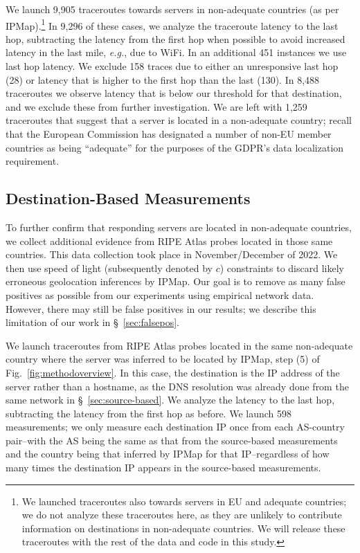 We launch 9,905 traceroutes towards servers in non-adequate countries (as per IPMap).\footnote{We launched 
traceroutes also towards servers in EU and adequate countries; we do not analyze these traceroutes here,
as they are unlikely to contribute information on destinations in non-adequate countries. We will
release these traceroutes with the rest of the data and code in this study.} 
In 9,296 of these cases, we analyze the traceroute latency to the last hop, 
subtracting the latency from the first hop
when possible to avoid increased latency in the last mile, \textit{e.g.}, due to WiFi.
In an additional 451 instances we use last hop latency. 
We exclude 158 traces due to either an unresponsive last hop 
(28) or latency that is higher to the first hop than the last (130).
In 8,488 traceroutes we observe latency that is below our threshold for that destination,
and we exclude these from further investigation. We are left with 1,259 traceroutes
that suggest that a server is located in a non-adequate country;
recall that the European Commission has designated a number of
non-EU member countries as being ``adequate'' for the purposes of
the GDPR's data localization requirement.~\cite{Adequacy38:online}


\subsection{Destination-Based Measurements}
\label{sec:destination-based}
To further confirm that responding servers are located in non-adequate countries, we 
collect additional evidence from RIPE Atlas probes located in those same countries.
This data collection took place in November/December of 2022.
We then use speed of light (subsequently denoted by $c$) constraints to 
discard likely erroneous geolocation inferences by IPMap.
Our goal is to remove as many false positives as possible from our experiments using empirical network data. 
However, there may still be false positives in our results; 
we describe this limitation of our work in \S~\ref{sec:falsepos}.

We launch traceroutes from RIPE Atlas probes located in the same non-adequate country
where the server was inferred to be located by IPMap, step (5) of Fig.~\ref{fig:methodoverview}. In this case, the
destination is the IP address of the server rather than a hostname,
as the DNS resolution was already done from the same network in \S~\ref{sec:source-based}.
We analyze the latency to the last hop, subtracting the latency from the first hop
as before.
We launch 598 measurements; we only measure each destination IP
once from each AS-country pair--with the AS being the 
same as that from the source-based measurements and the country 
being that inferred by IPMap for that IP--regardless of how many times the destination IP 
appears in the source-based measurements. 

